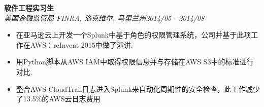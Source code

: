 \documentclass[3pt]{article}
\newenvironment{changemargin}[2]{%
  \begin{list}{}{%
    \setlength{\topsep}{0pt}%
    \setlength{\leftmargin}{#1}%
    \setlength{\rightmargin}{#2}%
    \setlength{\listparindent}{\parindent}%
    \setlength{\itemindent}{\parindent}%
    \setlength{\parsep}{\parskip}%
  }%
  \item[]}{\end{list}
}
\newcommand{\lineover}{
	\begin{changemargin}{-0.05in}{-0.05in}
		\vspace*{-8pt}
		\hrulefill \\
		\vspace*{-2pt}
	\end{changemargin}
}
\newcommand{\header}[1]{
	\begin{changemargin}{-0.5in}{-0.5in}
		{\Large \scshape{#1}}\\
  	\lineover
	\end{changemargin}
}
\newenvironment{body} {
	\vspace*{-16pt}
	\begin{changemargin}{-0.25in}{-0.5in}
  }	
	{\end{changemargin}
}
\begin{document}
\begin{CJK}{UTF8}{gbsn}
\begin{body}
   \vspace{5pt}

    \textbf{软件工程实习生} \\

    \emph{美国金融监管局 FINRA, 洛克维尔, 马里兰州}\hfill \emph{2014/05 - 2014/08}\\
     \begin{itemize} \itemsep -0.5pt
    \item{在亚马逊云上开发一个Splunk中基于角色的权限管理系统，公司并基于此项工作在AWS：reInvent 2015中做了演讲.}
     \item {用Python脚本从AWS IAM中取得权限信息并与存储在AWS S3中的标准进行对比.}
     \item {整合AWS CloudTrail日志进入Splunk来自动化周期性的安全检查，此工作减少了13.5\%的AWS云日志费用}
   
    \end{itemize}
	

\end{body}
\bigskip




\end{CJK}
\end{document}
